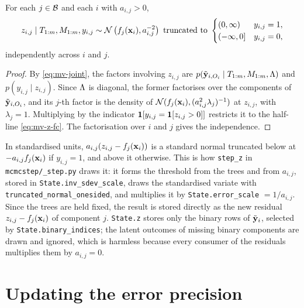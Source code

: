 \begin{prop}
	\label{prop:mv-z}
	For each $j \in \mathcal{B}$ and each $i$ with $a_{i,j} > 0$,
	\begin{equation}
		\label{eq:mv-z-fc}
		z_{i,j} \mid T_{1:m}, M_{1:m}, y_{i,j} \sim
		\mathcal{N}\left(f_j(\mathbf{x}_i), a_{i,j}^{-2}\right)
		\text{ truncated to }
		\begin{cases}
			(0, \infty)   & y_{i,j} = 1, \\
			(-\infty, 0] & y_{i,j} = 0,
		\end{cases}
	\end{equation}
	independently across $i$ and $j$.
\end{prop}

\begin{proof}
	By \eqref{eq:mv-joint}, the factors involving $z_{i,j}$ are
	$p(\tilde{\mathbf{y}}_{i,O_i} \mid T_{1:m}, M_{1:m}, \Lambda)$ and
	$p(y_{i,j} \mid z_{i,j})$. Since $\Lambda$ is diagonal, the former
	factorises over the components of $\tilde{\mathbf{y}}_{i,O_i}$, and its $j$-th factor is
	the density of $\mathcal{N}(f_j(\mathbf{x}_i), (a_{i,j}^2 \lambda_j)^{-1})$ at $z_{i,j}$,
	with $\lambda_j = 1$. Multiplying by the indicator
	$\mathbf{1}[y_{i,j} = \mathbf{1}[z_{i,j} > 0]]$ restricts it to the half-line
	\eqref{eq:mv-z-fc}. The factorisation over $i$ and $j$ gives the
	independence.
\end{proof}

In standardised units, $a_{i,j}(z_{i,j} - f_j(\mathbf{x}_i))$ is a standard normal
truncated below at $-a_{i,j} f_j(\mathbf{x}_i)$ if $y_{i,j} = 1$, and above it
otherwise. This is how \texttt{step\_z} in \texttt{mcmcstep/\_step.py}
draws it: it forms the threshold from the trees and from $a_{i,j}$, stored in
\texttt{State.inv\_sdev\_scale}, draws the standardised variate with
\texttt{truncated\_normal\_onesided}, and multiplies it by
\texttt{State.error\_scale} $= 1/a_{i,j}$. Since the trees are held fixed,
the result is stored directly as the new residual $z_{i,j} - f_j(\mathbf{x}_i)$ of
component $j$. \texttt{State.z} stores only the binary rows of $\tilde{\mathbf{y}}_i$,
selected by \texttt{State.binary\_indices}; the latent outcomes of missing
binary components are drawn and ignored, which is harmless because every
consumer of the residuals multiplies them by $a_{i,j} = 0$.

\section{Updating the error precision}
\label{sec:mv-Sigma}

